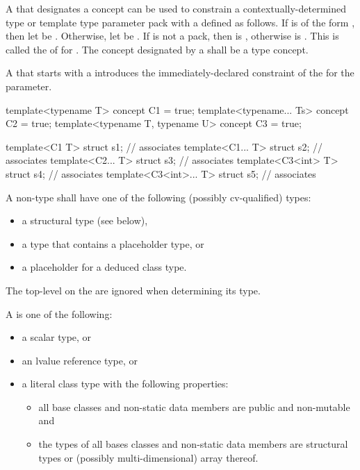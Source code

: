 \pnum
A   that designates a concept 
can be used to constrain a
contextually-determined type or template type parameter pack 
with a   defined as follows.
If  is of the form ,
then let  be .
Otherwise, let  be .
If  is not a pack,
then  is ,
otherwise  is .
This   is called the
of  for .
The concept designated by a 
shall be a type concept.

\pnum
A  that starts with a 
introduces the immediately-declared constraint
of the  for the parameter.
\begin{example}
\begin{codeblock}
template<typename T> concept C1 = true;
template<typename... Ts> concept C2 = true;
template<typename T, typename U> concept C3 = true;

template<C1 T> struct s1;               // associates 
template<C1... T> struct s2;            // associates 
template<C2... T> struct s3;            // associates 
template<C3<int> T> struct s4;          // associates 
template<C3<int>... T> struct s5;       // associates 
\end{codeblock}
\end{example}

\pnum
A non-type 
shall have one of the following (possibly cv-qualified) types:
\begin{itemize}
\item a structural type (see below),
\item a type that contains a placeholder type, or
\item a placeholder for a deduced class type.
\end{itemize}
The top-level
on the
are ignored when determining its type.

\pnum
A  is one of the following:
\begin{itemize}
\item a scalar type, or
\item an lvalue reference type, or
\item a literal class type with the following properties:
\begin{itemize}
\item
all base classes and non-static data members are public and non-mutable and
\item
the types of all bases classes and non-static data members are
structural types or (possibly multi-dimensional) array thereof.
\end{itemize}
\end{itemize}

